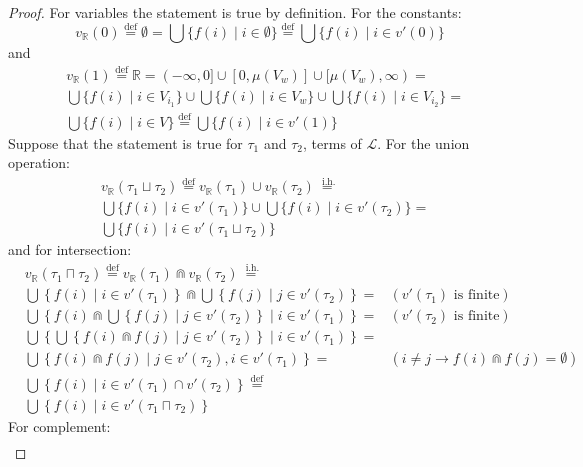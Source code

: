 \documentclass{article}
\newcommand{\R}{\mathbb{R}}
\newcommand{\bcap}{\Cap}
\newcommand{\lang}{\mathcal{L}}
\newcommand{\lcup}{\sqcup}
\newcommand{\lcap}{\sqcap}
\newcommand{\eqdef}{\stackrel{\text{def}}{=}}
\newcommand{\eqih}{\stackrel{\text{ i.h.}}{=}}
\begin{document}
\begin{proof}
    For variables the statement is true by definition. For the constants:
    \begin{equation*}
      v_\R(0) \eqdef \emptyset = \bigcup\{ f(i) \mid i \in \emptyset\} \eqdef \bigcup\{ f(i) \mid i \in v'(0)\}
    \end{equation*}
    and
    \begin{align*}
      & v_\R(1) \eqdef \R = (-\infty, 0] \cup [0, \mu(V_w)] \cup [\mu(V_w), \infty) = \\
    & \bigcup\{ f(i) \mid i \in V_{i_1}\} \cup \bigcup\{ f(i) \mid i \in V_w\} \cup \bigcup\{ f(i) \mid i \in V_{i_2}\} = \\
    & \bigcup\{ f(i) \mid i \in V\} \eqdef \bigcup\{ f(i) \mid i \in v'(1)\}
    \end{align*}
Suppose that the statement is true for $\tau_1$ and $\tau_2$, terms of $\lang$. For the union operation:
    \begin{align*}
      & v_\R(\tau_1 \lcup \tau_2) \eqdef v_\R(\tau_1) \cup v_\R(\tau_2) \eqih \\
      & \bigcup\{ f(i) \mid i \in v'(\tau_1)\} \cup \bigcup\{ f(i) \mid i \in v'(\tau_2)\} = \\
      & \bigcup\{ f(i) \mid i \in v'(\tau_1 \lcup \tau_2)\}
    \end{align*}
    and for intersection:
    \begin{align*}
      & v_\R(\tau_1 \lcap \tau_2) \eqdef v_\R(\tau_1) \bcap v_\R(\tau_2) \eqih \\
      & \bigcup\left\{ f(i) \mid i \in v'(\tau_1)\right\} \bcap \bigcup\left\{ f(j) \mid j \in v'(\tau_2)\right\} = & (v'(\tau_1) \text{ is finite}) \\
      & \bigcup\left\{ f(i) \bcap \bigcup\left\{ f(j) \mid j \in v'(\tau_2)\right\} \mid i \in v'(\tau_1)\right\} = & (v'(\tau_2) \text{ is finite}) \\
      & \bigcup\left\{ \bigcup\left\{ f(i) \bcap f(j) \mid j \in v'(\tau_2)\right\} \mid i \in v'(\tau_1)\right\} = \\
      & \bigcup\left\{ f(i) \bcap f(j) \mid j \in v'(\tau_2), i \in v'(\tau_1)\right\} = & (i \neq j \rightarrow f(i) \bcap f(j) = \emptyset) \\
      & \bigcup\left\{ f(i) \mid i \in v'(\tau_1) \cap v'(\tau_2)\right\} \eqdef \\
      & \bigcup\left\{ f(i) \mid i \in v'(\tau_1 \lcap \tau_2)\right\}
    \end{align*}
    For complement:
    \begin{align*}

\end{align*}
\end{proof}
\end{document}
